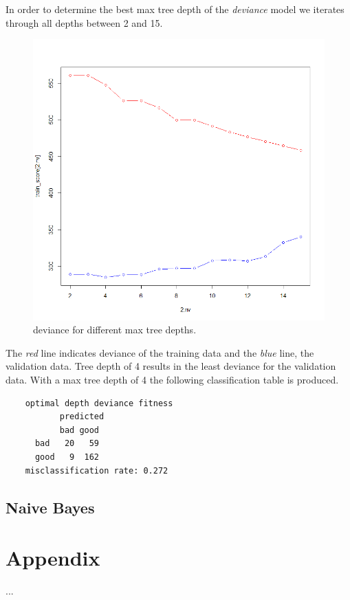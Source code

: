 \documentclass[a4paper, twocolumn]{article}
\begin{document}
	In order to determine the best max tree depth of the \textit{deviance} model we iterates through all depths between 2 and 15.
	\begin{figure}
	\centering
	\begin{minipage}[]{0.5\textwidth}
	  \includegraphics[width=\textwidth]{share/depth_tree.png}  
	  \caption{deviance for different max tree depths.\label{fig:tree_depth}}
	 \end{minipage}
	\end{figure}
	The \textit{red} line indicates deviance of the training data and the \textit{blue} line, the validation data. Tree depth of 4 results in the least deviance for the validation data. With a max tree depth of 4 the following classification table is produced.
	\begin{verbatim}
	optimal depth deviance fitness
	       predicted
	       bad good
	  bad   20   59
	  good   9  162
	misclassification rate: 0.272
	\end{verbatim}

	\subsection{Naive Bayes}
    
    \nocite{*} %
    
    
    \onecolumn \appendix
    \section*{Appendix}

        ...
\end{document}
